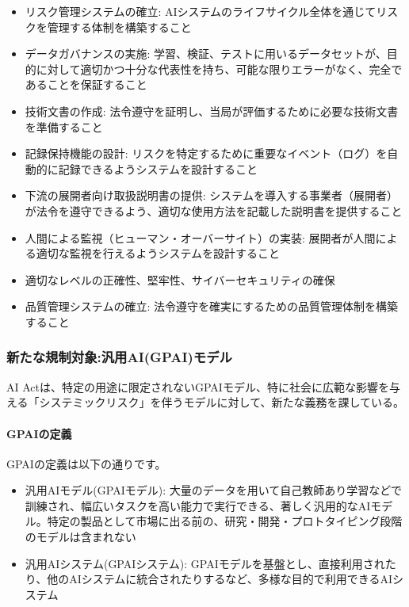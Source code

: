 \begin{itemize}
    \item リスク管理システムの確立: AIシステムのライフサイクル全体を通じてリスクを管理する体制を構築すること
    \item データガバナンスの実施: 学習、検証、テストに用いるデータセットが、目的に対して適切かつ十分な代表性を持ち、可能な限りエラーがなく、完全であることを保証すること
    \item 技術文書の作成: 法令遵守を証明し、当局が評価するために必要な技術文書を準備すること
    \item 記録保持機能の設計: リスクを特定するために重要なイベント（ログ）を自動的に記録できるようシステムを設計すること
    \item 下流の展開者向け取扱説明書の提供: システムを導入する事業者（展開者）が法令を遵守できるよう、適切な使用方法を記載した説明書を提供すること
    \item 人間による監視（ヒューマン・オーバーサイト）の実装: 展開者が人間による適切な監視を行えるようシステムを設計すること
    \item 適切なレベルの正確性、堅牢性、サイバーセキュリティの確保
    \item 品質管理システムの確立: 法令遵守を確実にするための品質管理体制を構築すること
\end{itemize}

\subsubsection{新たな規制対象:汎用AI(GPAI)モデル}
AI Actは、特定の用途に限定されないGPAIモデル、特に社会に広範な影響を与える「システミックリスク」を伴うモデルに対して、新たな義務を課している。

\paragraph{GPAIの定義}
GPAIの定義は以下の通りです。

\begin{itemize}
    \item 汎用AIモデル(GPAIモデル): 大量のデータを用いて自己教師あり学習などで訓練され、幅広いタスクを高い能力で実行できる、著しく汎用的なAIモデル。特定の製品として市場に出る前の、研究・開発・プロトタイピング段階のモデルは含まれない
    \item 汎用AIシステム(GPAIシステム): GPAIモデルを基盤とし、直接利用されたり、他のAIシステムに統合されたりするなど、多様な目的で利用できるAIシステム
\end{itemize}


